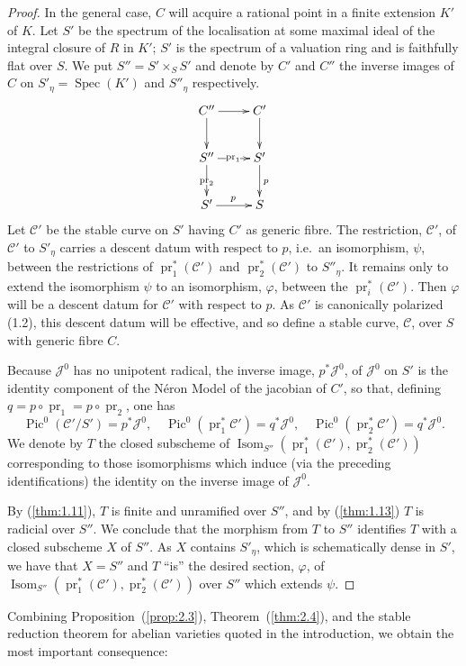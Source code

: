 \documentclass[10pt]{amsart}
\theoremstyle{plain}
\theoremstyle{definition}
\DeclareMathOperator{\Pic}{Pic}
\DeclareMathOperator{\Isom}{Isom}
\DeclareMathOperator{\Spec}{Spec}
\DeclareMathOperator{\pr}{pr}
\begin{document}
\begin{proof}
In the general case, $C$ will acquire a rational point in a finite extension $K'$ of $K$. Let $S'$ be the spectrum of the localisation at some maximal ideal of the integral closure of $R$ in $K'$; $S'$ is the spectrum of a valuation ring and is faithfully flat over $S$. We put $S'' = S' \times_S S'$ and denote by $C'$ and $C''$ the inverse images of $C$ on $S'_\eta = \Spec(K')$ and $S''_\eta$ respectively.
\[
\xymatrix{
C'' \ar[r] \ar[d] & C' \ar[d] \\
S'' \ar[r]|{\pr_1} \ar[d]|{\pr_2} & S' \ar[d]^p \\
S' \ar[r]^p & S
}
\]
Let $\mathscr{C}'$ be the stable curve on $S'$ having $C'$ as generic fibre. The restriction, $\mathscr{C}'$, of $\mathscr{C}'$ to $S'_\eta$ carries a descent datum with respect to $p$, i.e.~an isomorphism, $\psi$, between the restrictions of $\pr_1^*(\mathscr{C}')$ and $\pr_2^*(\mathscr{C}')$ to $S''_\eta$. It remains only to extend the isomorphism $\psi$ to an isomorphism, $\varphi$, between the $\pr_i^*(\mathscr{C}')$. Then $\varphi$ will be a descent datum for $\mathscr{C}'$ with respect to $p$. As $\mathscr{C}'$ is canonically polarized (1.2), this descent datum will be effective, and so define a stable curve, $\mathscr{C}$, over $S$ with generic fibre $C$.

Because $\mathscr{J}^0$ has no unipotent radical, the inverse image, $p^* \mathscr{J}^0$, of $\mathscr{J}^0$ on $S'$ is the identity component of the N\'eron Model of the jacobian of $C'$, so that, defining $q = p \circ \pr_1 = p \circ \pr_2$, one has
\[
\Pic^0(\mathscr{C}'/S') = p^* \mathscr{J}^0, \quad \Pic^0(\pr_1^* \mathscr{C}') = q^* \mathscr{J}^0, \quad \Pic^0(\pr_2^* \mathscr{C}') = q^* \mathscr{J}^0.
\]
We denote by $T$ the closed subscheme of $\Isom_{S''}(\pr_1^*(\mathscr{C}'), \pr_2^*(\mathscr{C}'))$ corresponding to those isomorphisms which induce (via the preceding identifications) the identity on the inverse image of $\mathscr{J}^0$.

By (\ref{thm:1.11}), $T$ is finite and unramified over $S''$, and by (\ref{thm:1.13}) $T$ is radicial over $S''$. We conclude that the morphism from $T$ to $S''$ identifies $T$ with a closed subscheme $X$ of $S''$. As $X$ contains $S'_\eta$, which is schematically dense in $S'$, we have that $X = S''$ and $T$ ``is'' the desired section, $\varphi$, of $\Isom_{S''}(\pr_1^*(\mathscr{C}'), \pr_2^*(\mathscr{C}'))$ over $S''$ which extends $\psi$.
\end{proof}

Combining Proposition~(\ref{prop:2.3}), Theorem~(\ref{thm:2.4}), and the stable reduction theorem for abelian varieties quoted in the introduction, we obtain the most important consequence:
\end{document}
